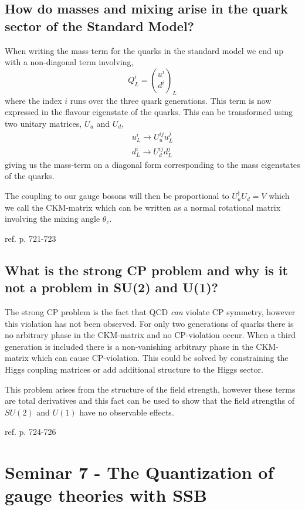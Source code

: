 \documentclass[paper=a4, fontsize=11pt]{scrartcl} %
\numberwithin{equation}{section} %
\numberwithin{figure}{section} %
\numberwithin{table}{section} %
\begin{document}
\subsection*{How do masses and mixing arise in the quark sector of the Standard Model?}
When writing the mass term for the quarks in the standard model we end up with a non-diagonal term involving,
\begin{equation}
Q^i_L = {u^i \choose d^i}_L
\end{equation}
where the index $i$ runs over the three quark generations. This term is now expressed in the flavour eigenstate of the quarks. This can be transformed using two unitary matrices, $U_u$ and $U_d$,
\begin{equation}
\begin{split}
u^i_L \rightarrow U^{ij}_u u^j_L \\
d^i_L \rightarrow U^{ij}_d d^j_L
\end{split}
\end{equation}
giving us the mass-term on a diagonal form corresponding to the mass eigenstates of the quarks. 

The coupling to our gauge bosons will then be proportional to $U_u^{\dagger}U_d = V$ which we call the CKM-matrix which can be written as a normal rotational matrix involving the mixing angle $\theta_c$.

ref. p. 721-723

\subsection*{What is the strong CP problem and why is it not a problem in SU(2) and U(1)?}
The strong CP problem is the fact that QCD \textit{can} violate CP symmetry, however this violation has not been observed. For only two generations of quarks there is no arbitrary phase in the CKM-matrix and no CP-violation occur. When a third generation is included there is a non-vanishing arbitrary phase in the CKM-matrix which can cause CP-violation. This could be solved by constraining the Higgs coupling matrices or add additional structure to the Higgs sector. 

This problem arises from the structure of the field strength, however these terms are total derivatives and this fact can be used to show that the field strengths of $SU(2)$ and $U(1)$ have no observable effects. 

ref. p. 724-726

\section*{Seminar 7 - The Quantization of gauge theories with SSB}
\end{document}

